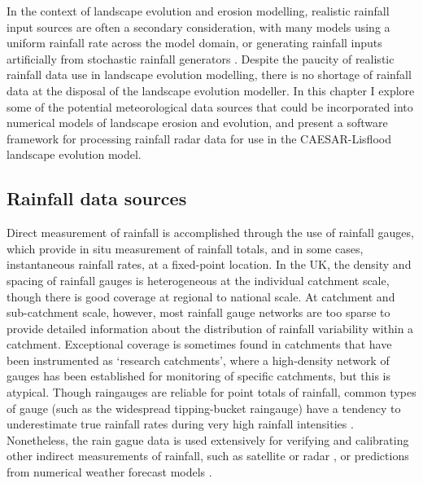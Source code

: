 In the context of landscape evolution and erosion modelling, realistic rainfall input sources are often a secondary consideration, with many models using a uniform rainfall rate across the model domain, or generating rainfall inputs artificially from stochastic rainfall generators \citep[Chapter \ref{chapter_RainfallInLEMs},][]{Tucker2000}. Despite the paucity of realistic rainfall data use in landscape evolution modelling, there is no shortage of rainfall data at the disposal of the landscape evolution modeller. In this chapter I explore some of the potential meteorological data sources that could be incorporated into numerical models of landscape erosion and evolution, and present a software framework for processing rainfall radar data for use in the CAESAR-Lisflood landscape evolution model.

\subsection{Rainfall data sources}
Direct measurement of rainfall is accomplished through the use of rainfall gauges, which provide in situ measurement of rainfall totals, and in some cases, instantaneous rainfall rates, at a fixed-point location. In the UK, the density and spacing of rainfall gauges is heterogeneous at the individual catchment scale, though there is good coverage at regional to national scale. At catchment and sub-catchment scale, however, most rainfall gauge networks are too sparse to provide detailed information about the distribution of rainfall variability within a catchment. Exceptional coverage is sometimes found in catchments that have been instrumented as `research catchments', where a high-density network of gauges has been established for monitoring of specific catchments, \citep[e.g. the Plynlimon research catchment,][]{newson1979results} but this is atypical. Though raingauges are reliable for point totals of rainfall, common types of gauge (such as the widespread tipping-bucket raingauge) have a tendency to underestimate true rainfall rates during very high rainfall intensities \citep{habib2001sampling,ciach2003local}. Nonetheless, the rain gague data is used extensively for verifying and calibrating other indirect measurements of rainfall, such as satellite or radar \citep{harrison2000improving,ebert2007methods}, or predictions from numerical weather forecast models \citep{golding2000quantitative}.

